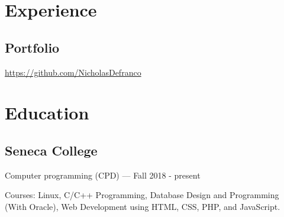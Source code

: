 \documentclass{article}
\begin{document}
\section{Experience}

\subsection{Portfolio}

\url{https://github.com/NicholasDefranco}

\section{Education}

\subsection{Seneca College}

Computer programming (CPD) --- Fall 2018 - present

Courses: Linux, C/C++ Programming, Database Design and Programming (With
Oracle), Web Development using HTML, CSS, PHP, and JavaScript.
\end{document}
